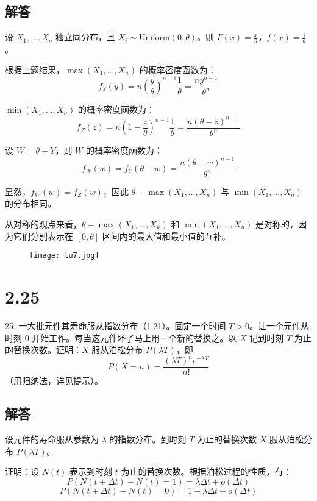 \documentclass[UTF8]{report}
\theoremstyle{MyLineTheoremStyle} %
\theoremstyle{MyBlockTheoremStyle} %
\theoremstyle{MySubsubsectionStyle} %
\begin{document}
\subsection*{解答}

设 \(X_1, \ldots, X_n\) 独立同分布，且 \(X_i \sim \text{Uniform}(0, \theta)\)。则 \(F(x) = \frac{x}{\theta}\)，\(f(x) = \frac{1}{\theta}\)。

根据上题结果，\(\max(X_1, \ldots, X_n)\) 的概率密度函数为：
\[
f_Y(y) = n \left( \frac{y}{\theta} \right)^{n-1} \frac{1}{\theta} = \frac{n y^{n-1}}{\theta^n}
\]

\(\min(X_1, \ldots, X_n)\) 的概率密度函数为：
\[
f_Z(z) = n \left( 1 - \frac{z}{\theta} \right)^{n-1} \frac{1}{\theta} = \frac{n (\theta - z)^{n-1}}{\theta^n}
\]

设 \(W = \theta - Y\)，则 \(W\) 的概率密度函数为：
\[
f_W(w) = f_Y(\theta - w) = \frac{n (\theta - w)^{n-1}}{\theta^n}
\]

显然，\(f_W(w) = f_Z(w)\)，因此 \(\theta - \max(X_1, \ldots, X_n)\) 与 \(\min(X_1, \ldots, X_n)\) 的分布相同。

从对称的观点来看，\(\theta - \max(X_1, \ldots, X_n)\) 和 \(\min(X_1, \ldots, X_n)\) 是对称的，因为它们分别表示在 \([0, \theta]\) 区间内的最大值和最小值的互补。

\begin{figure}[H]
    \centering
    \texttt{[image: tu7.jpg]}
\end{figure}


\section{2.25}

25. 一大批元件其寿命服从指数分布（1.21）。固定一个时间 \(T > 0\)。让一个元件从时刻 0 开始工作。每当这元件坏了马上用一个新的替换之。以 \(X\) 记到时刻 \(T\) 为止的替换次数。证明：\(X\) 服从泊松分布 \(P(\lambda T)\)，即
\[
P(X = n) = \frac{(\lambda T)^n e^{-\lambda T}}{n!}
\]
（用归纳法，详见提示）。

\subsection*{解答}

设元件的寿命服从参数为 \(\lambda\) 的指数分布。到时刻 \(T\) 为止的替换次数 \(X\) 服从泊松分布 \(P(\lambda T)\)。

证明：设 \(N(t)\) 表示到时刻 \(t\) 为止的替换次数。根据泊松过程的性质，有：
\[
P(N(t + \Delta t) - N(t) = 1) = \lambda \Delta t + o(\Delta t)
\]
\[
P(N(t + \Delta t) - N(t) = 0) = 1 - \lambda \Delta t + o(\Delta t)
\]
\end{document}
